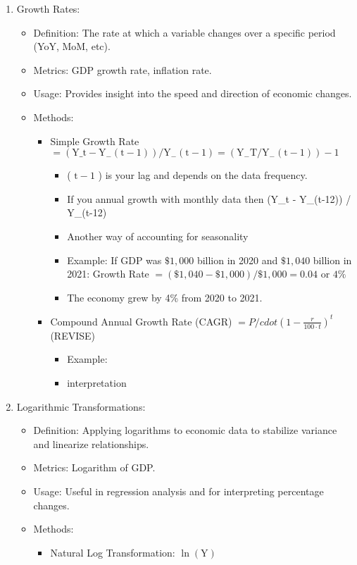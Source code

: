 \documentclass[10pt]{article}
\begin{document}
\begin{enumerate}
\begin{enumerate}
\begin{enumerate}
\begin{enumerate}
  \item Growth Rates:
    \begin{itemize}
      \item Definition: The rate at which a variable changes over a specific period (YoY, MoM, etc).
      \item Metrics: GDP growth rate, inflation rate.
      \item Usage: Provides insight into the speed and direction of economic changes.
      \item Methods:
      \begin{itemize}
        \item Simple Growth Rate $=\left(\mathrm{Y} \_\mathrm{t}-\mathrm{Y}_{-}(\mathrm{t}-1)\right) / \mathrm{Y}_{-}(\mathrm{t}-1)=\left(\mathrm{Y}_{-} \mathrm{T} / \mathrm{Y}_{-}(\mathrm{t}-1)\right)-1$
          \begin{itemize}
            \item ( $\mathrm{t}-1$ ) is your lag and depends on the data frequency.
            \item If you annual growth with monthly data then (Y\_t - Y\_(t-12)) / Y\_(t-12)
            \item Another way of accounting for seasonality

            \item Example: If GDP was $\$ 1,000$ billion in 2020 and $\$ 1,040$ billion in 2021: Growth Rate $=(\$ 1,040-\$ 1,000) / \$ 1,000=0.04$ or $4 \%$
            \item The economy grew by 4\% from 2020 to 2021.
          \end{itemize}

        \item Compound Annual Growth Rate (CAGR) $= P /cdot (1 - \frac{r}{100 \cdot t})^t $ (REVISE)
          \begin{itemize}
            \item Example:
            \item interpretation
          \end{itemize}
      \end{itemize}
      
      
    \end{itemize}


  \item Logarithmic Transformations:
    \begin{itemize}
      \item Definition: Applying logarithms to economic data to stabilize variance and linearize relationships.
      \item Metrics: Logarithm of GDP.
      \item Usage: Useful in regression analysis and for interpreting percentage changes.
      \item Methods:
      \begin{itemize}
        \item Natural Log Transformation: $\ln (\mathrm{Y})$


\end{itemize}
\end{itemize}
\end{enumerate}
\end{enumerate}
\end{enumerate}
\end{enumerate}
\end{document}
